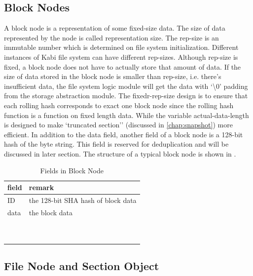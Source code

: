 \subsection{Block Nodes}

    A block node is a representation of some fixed-size data. The size of data represented by the node is called representation size. The rep-size is an immutable number which is determined on file system initialization. Different instances of Kabi file system can have different rep-sizes. Although rep-size is fixed, a block node does not have to actually store that amount of data. If the size of data stored in the block node is smaller than rep-size, i.e. there's insufficient data, the file system logic module will get the data with `\textbackslash0' padding from the storage abstraction module. The fixedr-rep-size design is to ensure that each rolling hash corresponds to exact one block node since the rolling hash function is a function on fixed length data. While the variable actual-data-length is designed to make `truncated section'' (discussed in \cref{chap:snapshot}) more efficient. In addition to the data field, another field of a block node is a 128-bit hash of the byte string. This field is reserved for deduplication and will be discussed in later section. The structure of a typical block node is shown in .

\begin{table}[t]
\begin{center}
\caption{Fields in Block Node}
\begin{tabular}{ll}
\toprule
field & remark\\
\midrule
ID & the 128-bit SHA hash of block data\\
data & the block data\\
\bottomrule
~\\
~\\
\end{tabular}
\end{center}
\label{tab:block_fields}
\end{table}

\subsection{File Node and Section Object}

